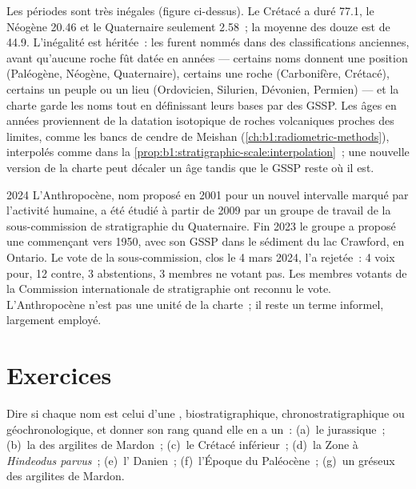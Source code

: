 Les périodes sont très inégales (figure ci-dessus). Le Crétacé a duré
\qty{77.1}{\Ma}, le Néogène \qty{20.46}{\Ma} et le Quaternaire seulement
\qty{2.58}{\Ma}~; la moyenne des douze est de \qty{44.9}{\Ma}. L'inégalité est
héritée~: les  furent nommés dans des classifications anciennes, avant qu'aucune roche fût
datée en années --- certains noms donnent une position (Paléogène, Néogène, Quaternaire),
certains une roche (Carbonifère, Crétacé), certains un peuple ou un lieu (Ordovicien,
Silurien, Dévonien, Permien) --- et la charte garde les noms tout en définissant
leurs bases par des GSSP. Les âges en années proviennent de la datation isotopique de
roches volcaniques proches des limites, comme les bancs de cendre de Meishan
(\cref{ch:b1:radiometric-methods}), interpolés comme dans la
\cref{prop:b1:stratigraphic-scale:interpolation}~; une nouvelle version de la charte peut
décaler un âge tandis que le GSSP reste où il est.

\begin{dated}{2024}
L'Anthropocène, nom proposé en 2001 pour un nouvel intervalle marqué par l'activité
humaine, a été étudié à partir de 2009 par un groupe de travail de la sous-commission de
stratigraphie du Quaternaire. Fin 2023 le groupe a proposé une  commençant
vers 1950, avec son GSSP dans le sédiment du lac Crawford, en Ontario. Le
vote de la sous-commission, clos le 4 mars 2024, l'a rejetée~: 4 voix pour, 12
contre, 3 abstentions, 3 membres ne votant pas. Les membres votants de la
Commission internationale de stratigraphie ont reconnu le vote. L'Anthropocène
n'est pas une unité de la charte~; il reste un terme informel, largement employé.
\end{dated}

\section{Exercices}

\begin{exercise}[$\star$]\label{exo:b1:stratigraphic-scale:1}
Dire si chaque nom est celui d'une , biostratigraphique,
chronostratigraphique ou géochronologique, et donner son rang quand elle en a
un~: (a)~le  jurassique~; (b)~la  des argilites de Mardon~; (c)~le Crétacé
inférieur~; (d)~la Zone à \emph{Hindeodus parvus}~; (e)~l' Danien~;
(f)~l'Époque du Paléocène~; (g)~un  gréseux des argilites de Mardon.
\end{exercise}

